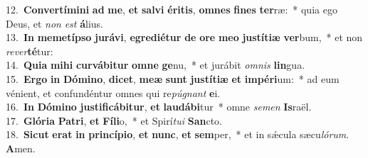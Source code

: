 {12.~}\textbf{Con}\textbf{ver}\textbf{tí}\textbf{mi}\textbf{ni} \textbf{ad} \textbf{me}, \textbf{et} \textbf{sal}\textbf{vi} \textbf{é}\textbf{ri}\textbf{tis}, \textbf{om}\textbf{nes} \textbf{fi}\textbf{nes} \textbf{ter}ræ:~* quia ego Deus, et \textit{non} \textit{est} \textbf{á}lius.\\
{13.~}\textbf{In} \textbf{me}\textbf{me}\textbf{tí}\textbf{pso} \textbf{ju}\textbf{rá}\textbf{vi}, \textbf{e}\textbf{gre}\textbf{di}\textbf{é}\textbf{tur} \textbf{de} \textbf{o}\textbf{re} \textbf{me}\textbf{o} \textbf{ju}\textbf{stí}\textbf{ti}\textbf{æ} \textbf{ver}bum,~* et non \textit{re}\textit{ver}\textbf{té}tur:\\
{14.~}\textbf{Qui}\textbf{a} \textbf{mi}\textbf{hi} \textbf{cur}\textbf{vá}\textbf{bi}\textbf{tur} \textbf{om}\textbf{ne} \textbf{ge}nu,~* et jurábit \textit{om}\textit{nis} \textbf{lin}gua.\\
{15.~}\textbf{Er}\textbf{go} \textbf{in} \textbf{Dó}\textbf{mi}\textbf{no}, \textbf{di}\textbf{cet}, \textbf{me}\textbf{æ} \textbf{sunt} \textbf{ju}\textbf{stí}\textbf{ti}\textbf{æ} \textbf{et} \textbf{im}\textbf{pé}\textbf{ri}um:~* ad eum vénient, et confundéntur omnes qui re\textit{pú}\textit{gnant} \textbf{e}i.\\
{16.~}\textbf{In} \textbf{Dó}\textbf{mi}\textbf{no} \textbf{ju}\textbf{sti}\textbf{fi}\textbf{cá}\textbf{bi}\textbf{tur}, \textbf{et} \textbf{lau}\textbf{dá}\textbf{bi}tur~* omne \textit{se}\textit{men} \textbf{Is}raël.\\
{17.~}\textbf{Gló}\textbf{ri}\textbf{a} \textbf{Pa}\textbf{tri}, \textbf{et} \textbf{Fí}\textbf{li}o,~* et Spirí\textit{tu}\textit{i} \textbf{San}cto.\\
{18.~}\textbf{Si}\textbf{cut} \textbf{e}\textbf{rat} \textbf{in} \textbf{prin}\textbf{cí}\textbf{pi}\textbf{o}, \textbf{et} \textbf{nunc}, \textbf{et} \textbf{sem}per,~* et in sǽcula sæcu\textit{ló}\textit{rum}. \textbf{A}men.\\
